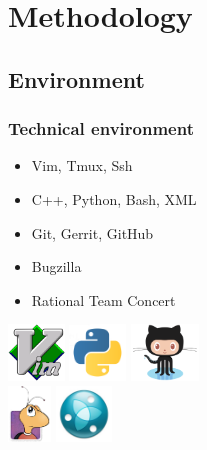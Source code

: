 %
%
\section{Methodology}

\currentSectionToc

\subsection{Environment}
\begin{frame}
    \frametitle{Technical environment}
    \begin{minipage}{0.49\textwidth}
    \begin{itemize}
        \item Vim, Tmux, Ssh
        \item C++, Python, Bash, XML
        \item Git, Gerrit, GitHub
        \item Bugzilla
        \item Rational Team Concert
    \end{itemize}
    \end{minipage}
    \begin{minipage}{0.49\textwidth}
        \flushright
        \includegraphics[height=1.5cm]{./img/vimLogo.png} \hspace{0.2cm}
        \includegraphics[height=1.5cm]{./img/pythonLogo.png} \hspace{0.2cm}
        \includegraphics[height=1.5cm]{./img/githubLogo.png} \\
        \includegraphics[height=1.5cm]{./img/bzLogo.png} \hspace{0.2cm}
        \includegraphics[height=1.5cm]{./img/rtcLogo.jpg}
    \end{minipage}
\end{frame}


